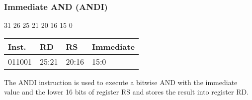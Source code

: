 \documentclass[12pt]{article}
\begin{document}

    \newpage
    \subsubsection{Immediate AND (ANDI)}
    
    \hspace{1.6cm}31 \hspace{1.15cm}26 \hspace{.05cm}25 \hspace{.8cm}21 \hspace{.05cm}20 \hspace{.8cm}16 \hspace{.05cm}15 \hspace{6.4cm}0
    \vspace{-.25cm}
    \begin{center}
        \begin{tabular}{ |p{1.8cm}|p{1.5cm}|p{1.5cm}|p{6.8cm}| }
            \hline
            \textbf{Inst.} & \textbf{RD} &  \textbf{RS} & \textbf{Immediate}\\
            \hline
            011001& 25:21 & 20:16 &15:0\\
            \hline
        \end{tabular}
    \end{center}
    
    \noindent
    The ANDI instruction is used to execute a bitwise AND with the immediate value and the lower 16 bits of register RS and stores the result into register RD. 
    
\end{document}
